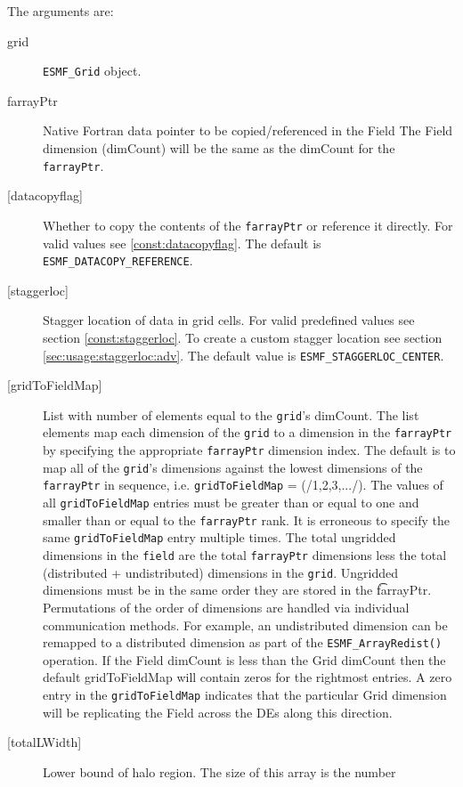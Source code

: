    The arguments are: 
   \begin{description} 
   \item [grid] 
   {\tt ESMF\_Grid} object. 
   \item [farrayPtr] 
   Native Fortran data pointer to be copied/referenced in the Field 
   The Field dimension (dimCount) will be the same as the dimCount 
   for the {\tt farrayPtr}. 
   \item [{[datacopyflag]}] 
   Whether to copy the contents of the {\tt farrayPtr} or reference it directly. 
   For valid values see \ref{const:datacopyflag}. The default is 
   {\tt ESMF\_DATACOPY\_REFERENCE}. 
   \item [{[staggerloc]}] 
   Stagger location of data in grid cells. For valid 
   predefined values see section \ref{const:staggerloc}. 
   To create a custom stagger location see section 
   \ref{sec:usage:staggerloc:adv}. The default 
   value is {\tt ESMF\_STAGGERLOC\_CENTER}. 
   \item [{[gridToFieldMap]}] 
   List with number of elements equal to the 
   {\tt grid}'s dimCount. The list elements map each dimension 
   of the {\tt grid} to a dimension in the {\tt farrayPtr} by 
   specifying the appropriate {\tt farrayPtr} dimension index. The default is to 
   map all of the {\tt grid}'s dimensions against the lowest dimensions of 
   the {\tt farrayPtr} in sequence, i.e. {\tt gridToFieldMap} = (/1,2,3,.../). 
   The values of all {\tt gridToFieldMap} entries must be greater than or equal 
   to one and smaller than or equal to the {\tt farrayPtr} rank. 
   It is erroneous to specify the same {\tt gridToFieldMap} entry 
   multiple times. The total ungridded dimensions in the {\tt field} 
   are the total {\tt farrayPtr} dimensions less 
   the total (distributed + undistributed) dimensions in 
   the {\tt grid}. Ungridded dimensions must be in the same order they are 
   stored in the {\t farrayPtr}. Permutations of the order of 
   dimensions are handled via individual communication methods. For example, 
   an undistributed dimension can be remapped to a distributed dimension 
   as part of the {\tt ESMF\_ArrayRedist()} operation. 
   If the Field dimCount is less than the Grid dimCount then the default 
   gridToFieldMap will contain zeros for the rightmost entries. A zero 
   entry in the {\tt gridToFieldMap} indicates that the particular 
   Grid dimension will be replicating the Field across the DEs along 
   this direction. 
   \item [{[totalLWidth]}] 
   Lower bound of halo region. The size of this array is the number 

\end{description}
